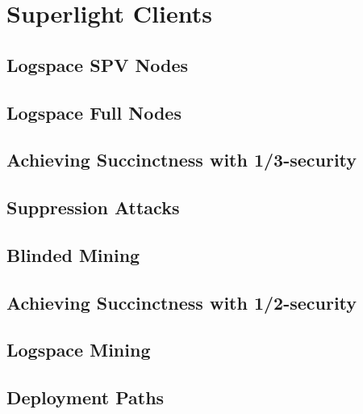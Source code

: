 \chapter{Superlight Clients}\label{chapter:superlight}

\section{Logspace SPV Nodes}
\section{Logspace Full Nodes}
\section{Achieving Succinctness with 1/3-security}
\section{Suppression Attacks}
\section{Blinded Mining}
\section{Achieving Succinctness with 1/2-security}
\section{Logspace Mining}
\section{Deployment Paths}
